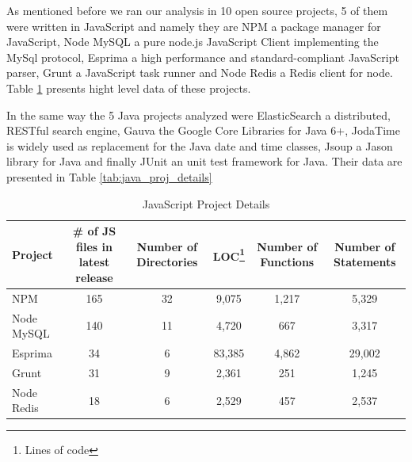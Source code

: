 As mentioned before we ran our analysis in 10 open source projects, 5 of them were written in JavaScript and namely they are NPM a package manager for JavaScript, Node MySQL a pure node.js JavaScript Client implementing the MySql protocol, Esprima a high performance and standard-compliant JavaScript parser, Grunt a JavaScript task runner and Node Redis a Redis client for node. Table \ref{tab:java_script_proj_details} presents hight level data of these projects.

In the same way the 5 Java projects analyzed were ElasticSearch a distributed, RESTful search engine, Gauva the Google Core Libraries for Java 6+, JodaTime is widely used as replacement for the Java date and time classes, Jsoup a Jason library for Java and finally JUnit an unit test framework for Java. Their data are presented in Table \ref{tab:java_proj_details}     

\begin{table}[!tbh]
	\begin{center}
		\caption{JavaScript Project Details }
		\label{tab:java_script_proj_details}
		\begin{tabular}{l| c c c c c}
			\toprule
			\textbf{Project} & \textbf{\# of JS files in latest release} & \textbf{Number of Directories} & \textbf{LOC\footnote{Lines of code}} & \textbf{Number of Functions} & \textbf{Number of Statements} \\ 
			\midrule
			NPM              & 165                                       & 32                             & 9,075                                & 1,217                        & 5,329                         \\
			Node MySQL       & 140                                       & 11                             & 4,720                                & 667                          & 3,317                         \\
			Esprima          & 34                                        & 6                              & 83,385                               & 4,862                        & 29,002                        \\
			Grunt            & 31                                        & 9                              & 2,361                                & 251                          & 1,245                         \\
			Node Redis       & 18                                        & 6                              & 2,529                                & 457                          & 2,537                         \\ 
			\bottomrule
		\end{tabular}
	\end{center}
\end{table}

